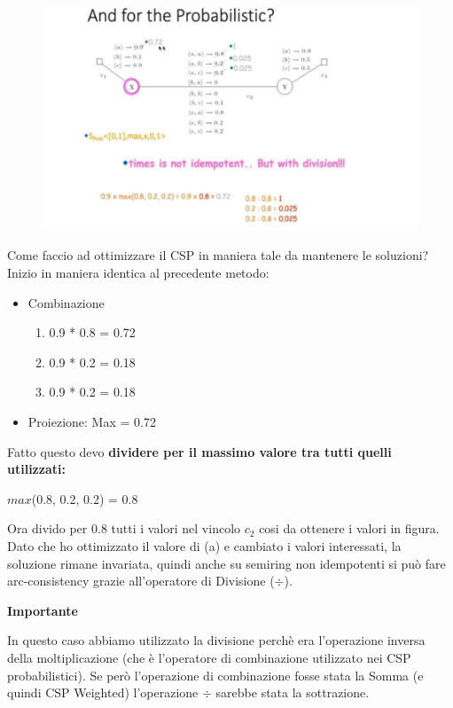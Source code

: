 \begin{figure}[htp]
	\centering
    \includegraphics[width=12cm, keepaspectratio]{img/Cap5/Probabilistic2.png}
\end{figure}
Come faccio ad ottimizzare il CSP in maniera tale da mantenere le soluzioni?
\\Inizio in maniera identica al precedente metodo:
\begin{itemize}
    \item Combinazione
    \begin{enumerate}
        \item 0.9 * 0.8 = 0.72
        \item 0.9 * 0.2 = 0.18
        \item 0.9 * 0.2 = 0.18
    \end{enumerate}
    \item Proiezione: Max = 0.72
\end{itemize}
\newpage
Fatto questo devo \textbf{dividere per il massimo valore tra tutti quelli utilizzati:}
\begin{center}
    $max$(0.8, 0.2, 0.2) = 0.8
\end{center}
Ora divido per 0.8 tutti i valori nel vincolo $c_2$ cosi da ottenere i valori in figura. Dato che ho ottimizzato il valore di (a) e cambiato i valori interessati, la soluzione rimane invariata, quindi anche su semiring non idempotenti si può fare arc-consistency grazie all'operatore di Divisione ($\div$).
\begin{center}
    \textbf{Importante}
\end{center}
In questo caso abbiamo utilizzato la divisione perchè era l'operazione inversa della moltiplicazione (che è l’operatore di combinazione utilizzato nei CSP probabilistici). Se però l’operazione di combinazione fosse stata la Somma (e quindi CSP Weighted) l’operazione $\div$ sarebbe stata la sottrazione.
